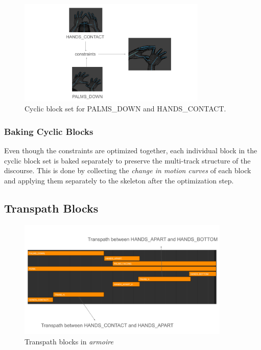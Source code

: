\documentclass[../../main.tex]{subfiles}
\begin{document}
\begin{figure}[h]
    \centering
    \includegraphics[width=0.8\textwidth]{chapters/multi_track/images/cyclic_blocks.png}
    \caption{Cyclic block set for PALMS\_DOWN and HANDS\_CONTACT.}
    \label{fig:cyclic_blocks}
\end{figure}

\subsubsection{Baking Cyclic Blocks}
\label{ch:multi_track:second_pass:cyclic_blocks:baking_cyclic_blocks}

Even though the constraints are optimized together, each individual block in the cyclic block set is baked separately to preserve the multi-track structure of the discourse. This is done by collecting the \emph{change in motion curves} of each block and applying them separately to the skeleton after the optimization step.

\subsection{Transpath Blocks}
\label{ch:multi_track:second_pass:transpath_blocks}

\begin{figure}[h]
    \centering
    \includegraphics[width=0.9\textwidth]{chapters/multi_track/images/transpath_blocks.png}
    \caption{Transpath blocks in \emph{armoire}}
    \label{fig:transpath_blocks}
\end{figure}
\end{document}
